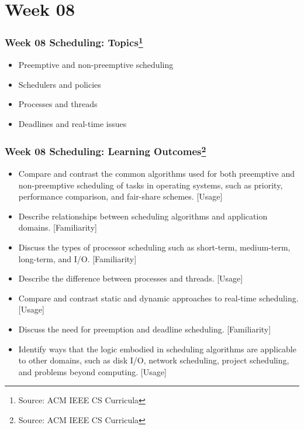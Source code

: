 
\section{Week 08}
\begin{frame}[fragile]
\frametitle{Week 08 Scheduling:
Topics\footnote{Source: ACM IEEE CS Curricula}}

\begin{itemize}
\item Preemptive and non-preemptive scheduling 
\item Schedulers and policies
\item Processes and threads
\item Deadlines and real-time issues
\end{itemize}
\end{frame}

\begin{frame}[fragile]
\frametitle{Week 08 Scheduling:
Learning Outcomes\footnote{Source: ACM IEEE CS Curricula}}
\begin{itemize}
\item Compare and contrast the common algorithms used for both preemptive and non-preemptive scheduling of tasks in operating systems, such as priority, performance comparison, and fair-share schemes. [Usage]
\item Describe relationships between scheduling algorithms and application domains. [Familiarity]
\item Discuss the types of processor scheduling such as short-term, medium-term, long-term, and I/O.  [Familiarity]
\item Describe the difference between processes and threads. [Usage]
\item Compare and contrast static and dynamic approaches to real-time scheduling. [Usage]
\item Discuss the need for preemption and deadline scheduling. [Familiarity]
\item Identify ways that the logic embodied in scheduling algorithms are applicable to other domains, such as disk I/O, network scheduling, project scheduling, and problems beyond computing. [Usage]
\end{itemize}

\end{frame}

